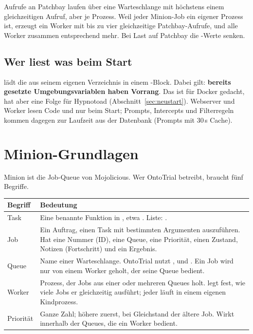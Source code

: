 \documentclass[11pt,a4paper,parskip=half-,headings=standardclasses,toc=bibliography,open=any]{scrreprt}
\begin{document}
\begin{hinweis}
Aufrufe an Patchbay laufen über eine Warteschlange mit höchstens einem gleichzeitigen Aufruf, aber je Prozess. Weil jeder Minion-Job ein eigener Prozess ist, erzeugt ein Worker mit  bis zu vier gleichzeitige Patchbay-Aufrufe, und alle Worker zusammen entsprechend mehr. Bei Last auf Patchbay die -Werte senken.
\end{hinweis}

\section{Wer liest was beim Start}

 lädt die  aus seinem eigenen Verzeichnis in einem -Block. Dabei gilt: \textbf{bereits gesetzte Umgebungsvariablen haben Vorrang}. Das ist für Docker gedacht, hat aber eine Folge für Hypnotoad (Abschnitt~\ref{sec:neustart}). Webserver und Worker lesen Code und  nur beim Start; Prompts, Intercepts und Filterregeln kommen dagegen zur Laufzeit aus der Datenbank (Prompts mit 30\,s Cache).

\chapter{Minion-Grundlagen}\label{kap:minion}

Minion ist die Job-Queue von Mojolicious. Wer OntoTrial betreibt, braucht fünf Begriffe.

\begin{longtable}{@{}P{3.0cm}p{11.6cm}@{}}
\toprule
\textbf{Begriff} & \textbf{Bedeutung}\\
\midrule
\endhead
Task & Eine benannte Funktion in , etwa . Liste: .\\
Job & Ein Auftrag, einen Task mit bestimmten Argumenten auszuführen. Hat eine Nummer (ID), eine Queue, eine Priorität, einen Zustand, Notizen (Fortschritt) und ein Ergebnis.\\
Queue & Name einer Warteschlange. OntoTrial nutzt ,  und . Ein Job wird nur von einem Worker geholt, der seine Queue bedient.\\
Worker & Prozess, der Jobs aus einer oder mehreren Queues holt.  legt fest, wie viele Jobs er gleichzeitig ausführt; jeder läuft in einem eigenen Kindprozess.\\
Priorität & Ganze Zahl; höhere zuerst, bei Gleichstand der ältere Job. Wirkt innerhalb der Queues, die ein Worker bedient.\\
\bottomrule
\end{longtable}
\end{document}
